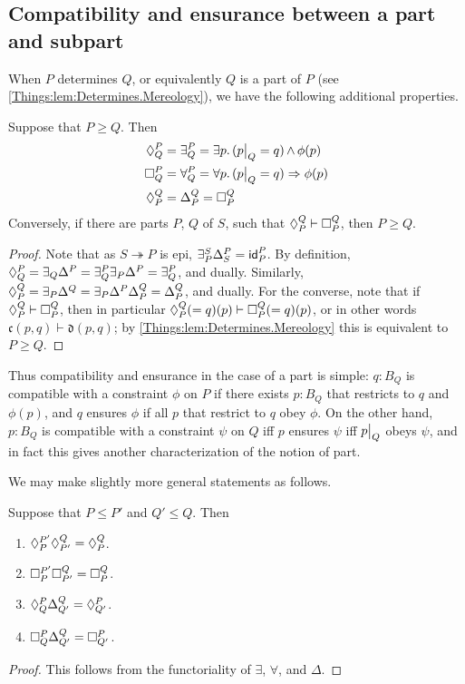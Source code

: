 \subsection{Compatibility and ensurance between a part and subpart}
When $P$ determines $Q$, or equivalently $Q$ is a part of $P$ (see \cref{Things:lem:Determines.Mereology}), we have the following additional properties.
\begin{prop} \label{Things:prop:parts}
Suppose that $P \geq Q$. Then
\begin{align*}
    \compat{P}{Q} &= \exists^P_Q = \exists p.\, (\rest{p}{Q} = q) \meet \phi(p) \\
    \ensure{P}{Q} &= \forall^P_Q = \forall p.\, (\rest{p}{Q} = q) \Rightarrow \phi(p) \\
    \compat{Q}{P} &= \Delta^Q_P = \ensure{Q}{P}
\end{align*}
Conversely, if there are parts $P$, $Q$ of $S$, such that $\compat{Q}{P} \vdash \ensure{Q}{P}$, then $P \geq Q$.
\end{prop}
\begin{proof}
Note that as $S \twoheadrightarrow P$ is epi, $\exists^S_P\Delta^P_S = \id^P_P$. By definition, $\compat{P}{Q} = \exists_Q \Delta^P = \exists^P_Q \exists_P \Delta^P = \exists^P_Q$, and dually. Similarly, $\compat{Q}{P} = \exists_P\Delta^Q = \exists_P \Delta^P \Delta^Q_P = \Delta^Q_P$, and dually. For the converse, note that if $\compat{Q}{P} \vdash \ensure{Q}{P}$, then in particular $\compat{Q}{P}(=q)(p) \vdash \ensure{Q}{P}(=q)(p)$, or in other words $\mathfrak{c}(p, q) \vdash \mathfrak{d}(p, q)$; by  \cref{Things:lem:Determines.Mereology} this is equivalent to $P \geq Q$.
\end{proof}

Thus compatibility and ensurance in the case of a part is simple: $q : B_Q$ is compatible with a constraint $\phi$ on $P$ if there exists $p : B_Q$ that restricts to $q$ and $\phi(p)$, and $q$ ensures $\phi$ if all $p$ that restrict to $q$ obey $\phi$. On the other hand, $p : B_Q$ is compatible with a constraint $\psi$ on $Q$ iff $p$ ensures $\psi$ iff $\rest{p}{Q}$ obeys $\psi$, and in fact this gives another characterization of the notion of part.

We may make slightly more general statements as follows.
\begin{prop}\label{Things:prop:parts.operations}
Suppose that $P \leq P'$ and $Q' \leq Q$. Then
\begin{enumerate}
    \item $\compat{P'}{P} \compat{Q}{P'} = \compat{Q}{P}$.
    \item $\ensure{P'}{P} \ensure{Q}{P'} = \ensure{Q}{P}$.
    \item $\compat{P}{Q} \Delta^{Q}_{Q'} = \compat{P}{Q'}$.
    \item $\ensure{P}{Q} \Delta^{Q}_{Q'} = \ensure{P}{Q'}$.
\end{enumerate}
\end{prop}
\begin{proof}
This follows from the functoriality of $\exists$, $\forall$, and $\Delta$.
\end{proof}

